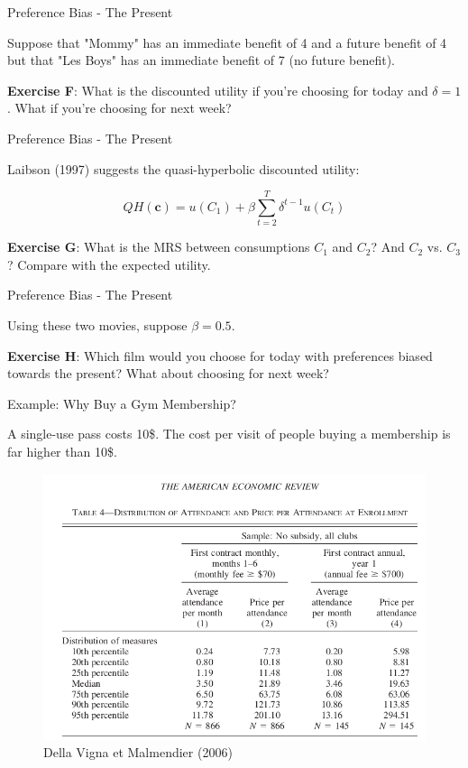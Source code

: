 \documentclass[handout]{beamer}
\begin{document}
\begin{frame}{Preference Bias - The Present}

Suppose that "Mommy" has an immediate benefit of 4 and a future benefit of 4 but that "Les Boys" has an immediate benefit of 7 (no future benefit). \vspace{0.25in}

\textbf{Exercise F}: What is the discounted utility if you're choosing for today and $\delta=1$. What if you're choosing for next week?

\end{frame}


\begin{frame}{Preference Bias - The Present}

Laibson (1997) suggests the quasi-hyperbolic discounted utility: 

$$QH(\mathbf{c}) = u(C_1) + \beta \sum_{t=2}^T \delta^{t-1} u(C_t)$$

\textbf{Exercise G}: What is the MRS between consumptions $C_1$ and $C_2$? And $C_2$ vs. $C_3$? Compare with the expected utility.

\end{frame}

\begin{frame}{Preference Bias - The Present}

Using these two movies, suppose $\beta=0.5$. 
\vspace{0.5in}

\textbf{Exercise H}: Which film would you choose for today with preferences biased towards the present? What about choosing for next week?

\end{frame}

\begin{frame}{Example: Why Buy a Gym Membership?}

A single-use pass costs 10\$. The cost per visit of people buying a membership is far higher than 10\$. 

\begin{figure}
\includegraphics[scale=0.3]{Gym.png}
\caption{Della Vigna et Malmendier (2006)}
\end{figure}

\end{frame}
\end{document}
